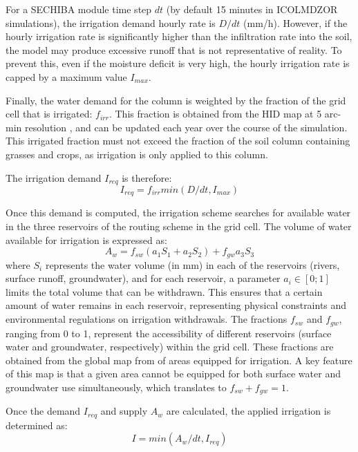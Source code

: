 For a SECHIBA module time step $dt$ (by default 15 minutes in ICOLMDZOR simulations), the irrigation demand hourly rate is $D/dt$ (mm/h). However, if the hourly irrigation rate is significantly higher than the infiltration rate into the soil, the model may produce excessive runoff that is not representative of reality. To prevent this, even if the moisture deficit is very high, the hourly irrigation rate is capped by a maximum value $I_{max}$.

Finally, the water demand for the column is weighted by the fraction of the grid cell that is irrigated: $f_{irr}$. This fraction is obtained from the HID map at 5 arc-min resolution \citep{siebert_quantifying_2010}, and can be updated each year over the course of the simulation.
This irrigated fraction must not exceed the fraction of the soil column containing grasses and crops, as irrigation is only applied to this column.

The irrigation demand $I_{req}$ is therefore:
\begin{equation}
    I_{req} = f_{irr} min(D/dt, I_{max})
\end{equation}

Once this demand is computed, the irrigation scheme searches for available water in the three reservoirs of the routing scheme in the grid cell.
The volume of water available for irrigation is expressed as:
\begin{equation}
    A_w = f_{sw} (a_1 S_1 + a_2 S_2)+ f_{gw}a_3 S_3
\end{equation}
where $S_i$ represents the water volume (in mm) in each of the reservoirs (rivers, surface runoff, groundwater), and for each reservoir, a parameter $a_i \in [0;1]$ limits the total volume that can be withdrawn. This ensures that a certain amount of water remains in each reservoir, representing physical constraints and environmental regulations on irrigation withdrawals.
The fractions $f_{sw}$ and $f_{gw}$, ranging from 0 to 1, represent the accessibility of different reservoirs (surface water and groundwater, respectively) within the grid cell. These fractions are obtained from the global map from \citet{siebert_groundwater_2010} of areas equipped for irrigation. A key feature of this map is that a given area cannot be equipped for both surface water and groundwater use simultaneously, which translates to $f_{sw} + f_{gw} =1$.

Once the demand $I_{req}$ and supply $A_w$ are calculated, the applied irrigation is determined as:
\begin{equation}
    I = min(A_w/dt, I_{req})
\end{equation}

